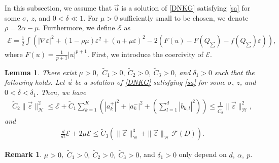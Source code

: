 \documentclass[reqno]{amsart}
\theoremstyle{plain}
\newtheorem{lemma}[theorem]{Lemma}
\theoremstyle{definition}
\newtheorem{remark}{Remark}[section]
\numberwithin{equation}{section}
\newcommand{\1}{\mathbbm{1}}
\begin{document}
In this subsection, we assume that $\vec{u}$ is a solution of \eqref{DNKG} satisfying \eqref{sa} for some $\sigma,\ z$, and $0<\delta\ll 1$. For $\mu>0$ sufficiently small to be chosen, we denote $\rho=2\alpha-\mu$. Furthermore, we define $\mathcal{E}$ as
\begin{align*}
\mathcal{E}=\frac{1}{2}\int \left(|\nabla\varepsilon|^2+(1-\rho \mu)\varepsilon^2+(\eta+\mu \varepsilon)^2-2(F(u)-F(Q_{\sum})-f(Q_{\sum})\varepsilon)\right),
\end{align*}
where $F(u)=\frac{1}{p+1}|u|^{p+1}$. First, we introduce the coercivity of $\mathcal{E}$.
\begin{lemma}\label{enelem}
There exist $\mu>0$,\ $\tilde{C}_1>0,\ \tilde{C}_2>0,\ \tilde{C}_3>0$, and $\delta_1>0$ such that the following holds. Let $\vec{u}$ be a solution of \eqref{DNKG} satisfying \eqref{sa} for some $\sigma,\ z$, and $0<\delta<\delta_1$. Then, we have
 \begin{align}\label{Esiml}
\tilde{C}_2\|\vec{\varepsilon}\|_{\mathcal{H}}^2\leq \mathcal{E}+\tilde{C}_1\sum_{k=1}^K\left( |a_k^+|^2+|a_k^-|^2+(\sum_{l=1}^d|b_{k,l}|^2)\right)\leq\frac{1}{\tilde{C}_2}\|\vec{\varepsilon}\|_{\mathcal{H}}^2,
\end{align}
and 
\begin{align}\label{Edecay}
\frac{d}{dt}\mathcal{E}+2\mu \mathcal{E}\leq \tilde{C}_3\left( \|\vec{\varepsilon}\|_{\mathcal{H}}^3+\|\vec{\varepsilon}\|_{\mathcal{H}}\mathcal{F}(D)\right).
\end{align}
\end{lemma}
\begin{remark}
$\mu>0$,\ $\tilde{C}_1>0,\ \tilde{C}_2>0,\ \tilde{C}_3>0$, and $\delta_1>0$ only depend on $d,\ \alpha,\ p$.
\end{remark}
\end{document}
